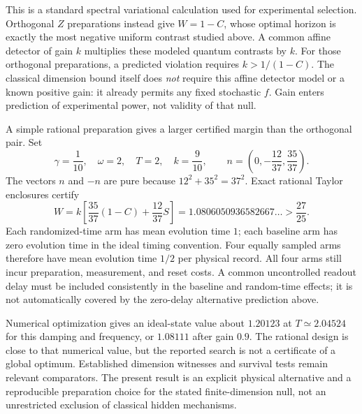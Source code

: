 This is a standard spectral variational calculation used for experimental
selection.  Orthogonal $Z$ preparations instead give $W=1-C$, whose optimal
horizon is exactly the most negative uniform contrast studied above.  A common
affine detector of gain $k$ multiplies these modeled quantum contrasts by $k$.
For those orthogonal preparations, a predicted violation requires
$k>1/(1-C)$.  The classical dimension bound itself does \emph{not} require this
affine detector model or a known positive gain: it already permits any fixed
stochastic $f$.  Gain enters prediction of experimental power, not validity
of that null.

A simple rational preparation gives a larger certified margin than the
orthogonal pair.  Set
\[
 \gamma=\frac1{10},\quad\omega=2,\quad T=2,\quad k=\frac9{10},
 \qquad n=\left(0,-\frac{12}{37},\frac{35}{37}\right).
\]
The vectors $n$ and $-n$ are pure because $12^2+35^2=37^2$.  Exact rational
Taylor enclosures certify
\begin{equation}
 W=k\left[\frac{35}{37}(1-C)+\frac{12}{37}S\right]
 =1.0806050936582667\ldots>\frac{27}{25}.
 \label{eq:rr-rational-dimension-witness}
\end{equation}
Each randomized-time arm has mean evolution time $1$; each baseline arm has
zero evolution time in the ideal timing convention.  Four equally sampled
arms therefore have mean evolution time $1/2$ per physical record.  All four
arms still incur preparation, measurement, and reset costs.  A common
uncontrolled readout delay must be included consistently in the baseline and
random-time effects; it is not automatically covered by the zero-delay
alternative prediction above.

Numerical optimization gives an ideal-state value about $1.20123$ at
$T\simeq2.04524$ for this damping and frequency, or $1.08111$ after gain $0.9$.
The rational design is close to that numerical value, but the reported search
is not a certificate of a global optimum.  Established dimension witnesses and
survival tests remain relevant comparators.  The present result is an explicit
physical alternative and a reproducible preparation choice for the stated
finite-dimension null, not an unrestricted exclusion of classical hidden
mechanisms.

